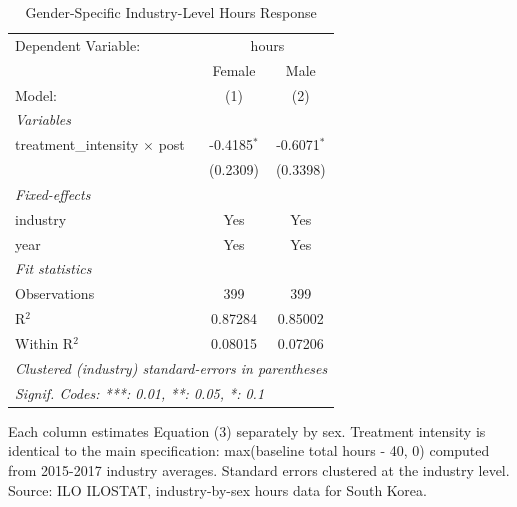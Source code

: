 
\begin{table}[htbp]
   \caption{\label{tab:gender} Gender-Specific Industry-Level Hours Response}
   \centering
   \begin{tabular}{lcc}
      \tabularnewline \midrule \midrule
      Dependent Variable: & \multicolumn{2}{c}{hours}\\
                                           & Female        & Male \\   
      Model:                               & (1)           & (2)\\  
      \midrule
      \emph{Variables}\\
      treatment\_intensity $\times$ post   & -0.4185$^{*}$ & -0.6071$^{*}$\\   
                                           & (0.2309)      & (0.3398)\\   
      \midrule
      \emph{Fixed-effects}\\
      industry                             & Yes           & Yes\\  
      year                                 & Yes           & Yes\\  
      \midrule
      \emph{Fit statistics}\\
      Observations                         & 399           & 399\\  
      R$^2$                                & 0.87284       & 0.85002\\  
      Within R$^2$                         & 0.08015       & 0.07206\\  
      \midrule \midrule
      \multicolumn{3}{l}{\emph{Clustered (industry) standard-errors in parentheses}}\\
      \multicolumn{3}{l}{\emph{Signif. Codes: ***: 0.01, **: 0.05, *: 0.1}}\\
   \end{tabular}
   
   \par \raggedright 
   Each column estimates Equation (3) separately by sex. Treatment intensity is identical to the main specification: max(baseline total hours - 40, 0) computed from 2015-2017 industry averages. Standard errors clustered at the industry level. Source: ILO ILOSTAT, industry-by-sex hours data for South Korea.
\end{table}


